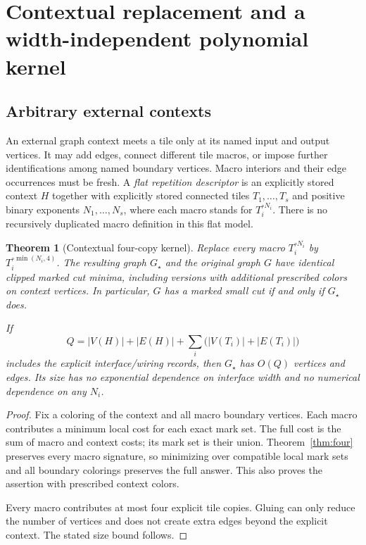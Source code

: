 \documentclass[11pt]{article}
\newtheorem{theorem}{Theorem}[section]
\theoremstyle{remark}\newtheorem{remark}[theorem]{Remark}
\begin{document}
\section{Contextual replacement and a width-independent polynomial kernel}
\subsection{Arbitrary external contexts}
An external graph context meets a tile only at its named input and output vertices. It may add edges, connect different tile macros, or impose further identifications among named boundary vertices. Macro interiors and their edge occurrences must be fresh. A \emph{flat repetition descriptor} is an explicitly stored context $H$ together with explicitly stored connected tiles $T_1,\ldots,T_s$ and positive binary exponents $N_1,\ldots,N_s$, where each macro stands for $T_i^{\circ N_i}$. There is no recursively duplicated macro definition in this flat model.

\begin{theorem}[Contextual four-copy kernel]
\label{thm:kernel}
Replace every macro $T_i^{\circ N_i}$ by $T_i^{\circ\min(N_i,4)}$. The resulting graph $G_\star$ and the original graph $G$ have identical clipped marked cut minima, including versions with additional prescribed colors on context vertices. In particular, $G$ has a marked small cut if and only if $G_\star$ does.

If
\[
 Q=|V(H)|+|E(H)|+\sum_i\bigl(|V(T_i)|+|E(T_i)|\bigr)
\]
includes the explicit interface/wiring records, then $G_\star$ has $O(Q)$ vertices and edges. Its size has no exponential dependence on interface width and no numerical dependence on any $N_i$.
\end{theorem}
\begin{proof}
Fix a coloring of the context and all macro boundary vertices. Each macro contributes a minimum local cost for each exact mark set. The full cost is the sum of macro and context costs; its mark set is their union. Theorem~\ref{thm:four} preserves every macro signature, so minimizing over compatible local mark sets and all boundary colorings preserves the full answer. This also proves the assertion with prescribed context colors.

Every macro contributes at most four explicit tile copies. Gluing can only reduce the number of vertices and does not create extra edges beyond the explicit context. The stated size bound follows.
\end{proof}
\end{document}
